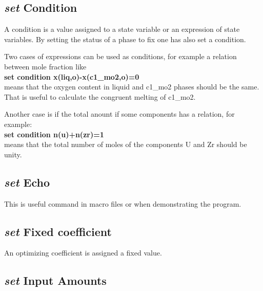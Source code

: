 \documentclass[12pt]{article}
\begin{document}
\subsection{{\em set} Condition}

A condition is a value assigned to a state variable or an expression
of state variables.  By setting the status of a phase to fix one has
also set a condition.

Two cases of expressions can be used as conditions, for example a
relation between mole fraction like\\
{\bf set condition x(liq,o)-x(c1\_mo2,o)=0}\\
means that the oxygen content in liquid and c1\_mo2 phases should be the
same.  That is useful to calculate the congruent melting of c1\_mo2.

Another case is if the total anount if some components has a relation,
for example:\\ 
{\bf set condition n(u)+n(zr)=1}\\ 
means that the total number of moles of the components U and Zr should
be unity.
\subsection{{\em set} Echo}

This is useful command in macro files or when demonstrating the program.

\subsection{{\em set} Fixed coefficient}

An optimizing coefficient is assigned a fixed value.

\subsection{{\em set} Input Amounts}
\end{document}
